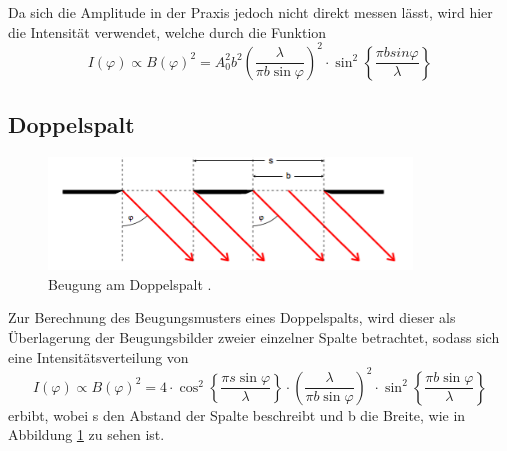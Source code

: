Da sich die Amplitude in der Praxis jedoch nicht direkt messen lässt, wird hier
die Intensität verwendet, welche durch die Funktion
\begin{equation}
  I(\varphi) \propto B(\varphi)^2 = A_0^2b^2\left(\frac{\lambda}{\pi b \sin{\varphi}}\right)^2
  \cdot \sin^2\left\{{\frac{\pi b sin{\varphi}}{\lambda}}\right\}
  \label{eqn:int1}
\end{equation}
\subsection{Doppelspalt}
\begin{figure}[H]
  \centering
  \includegraphics[height=3cm]{Doppel.png}
  \caption{Beugung am Doppelspalt \cite{skript}.}
  \label{fig:doppel}
\end{figure}
Zur Berechnung des Beugungsmusters eines Doppelspalts, wird dieser als
Überlagerung der Beugungsbilder zweier einzelner Spalte betrachtet, sodass
sich eine Intensitätsverteilung von
\begin{equation}
  I(\varphi) \propto B(\varphi)^2 =4 \cdot \cos^2\left\{{\frac{\pi s \sin{\varphi}}{\lambda}}\right\}
  \cdot \left(\frac{\lambda}{\pi b \sin{\varphi}}\right)^2 \cdot \sin^2\left\{{\frac{\pi
  b \sin{\varphi}}{\lambda}}\right\}
  \label{eqn:doppelinf}
\end{equation}
erbibt, wobei s den Abstand der Spalte beschreibt und b die Breite, wie in Abbildung
\ref{fig:doppel} zu sehen ist.
